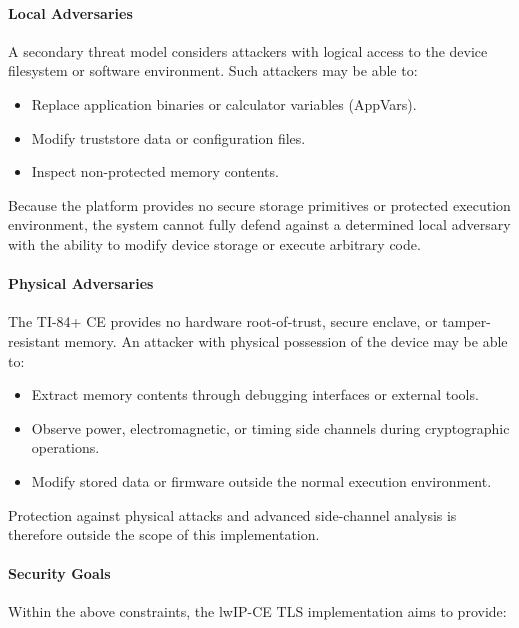 \documentclass[titlepage]{report}
\begin{document}
	\paragraph{Local Adversaries}
	
	A secondary threat model considers attackers with logical access to the device filesystem or software environment. Such attackers may be able to:
	
	\begin{itemize}
		\item Replace application binaries or calculator variables (AppVars).
		\item Modify truststore data or configuration files.
		\item Inspect non-protected memory contents.
	\end{itemize}
	
	Because the platform provides no secure storage primitives or protected execution environment, the system cannot fully defend against a determined local adversary with the ability to modify device storage or execute arbitrary code.
	
	\paragraph{Physical Adversaries}
	
	The TI-84+ CE provides no hardware root-of-trust, secure enclave, or tamper-resistant memory. An attacker with physical possession of the device may be able to:
	
	\begin{itemize}
		\item Extract memory contents through debugging interfaces or external tools.
		\item Observe power, electromagnetic, or timing side channels during cryptographic operations.
		\item Modify stored data or firmware outside the normal execution environment.
	\end{itemize}
	
	Protection against physical attacks and advanced side-channel analysis is therefore outside the scope of this implementation.
	
	\paragraph{Security Goals}
	
	Within the above constraints, the lwIP-CE TLS implementation aims to provide:
	
\end{document}
